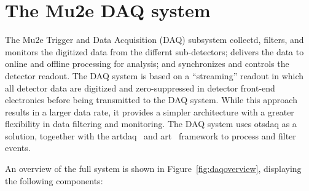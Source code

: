 \newpage
\section{The Mu2e DAQ system}
\label{sec:daq}
The Mu2e Trigger and Data Acquisition (DAQ) subsystem collectd, filters, and  monitors the digitized data from the differnt sub-detectors; delivers the data to online and offline processing for analysis; and  synchronizes and controls the detector readout. The DAQ system is based on a “streaming” readout in which all detector data are digitized and zero-suppressed in detector front-end electronics before being transmitted to the DAQ system. While this approach results in a larger data rate, it provides a simpler architecture with a greater flexibility in data filtering and monitoring. The DAQ system uses otsdaq\cite{} as a solution, togeether with the artdaq~\cite{} and art~\cite{} framework to process and filter events. 

An overview of the full system is shown in Figure~\ref{fig:daqoverview}, displaying the following components:


